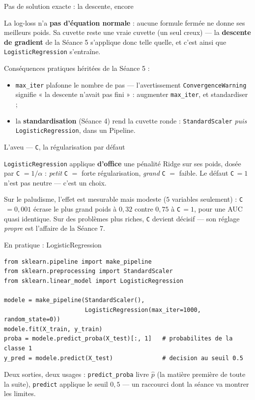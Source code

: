 \documentclass[aspectratio=169,11pt]{beamer}
\begin{document}
\begin{frame}{Pas de solution exacte : la descente, encore}
\begin{ucaddef}
{\small La log-loss n'a \textbf{pas d'équation normale} : aucune formule fermée ne donne ses meilleurs poids. Sa cuvette reste une vraie cuvette (un seul creux) — la \textbf{descente de gradient} de la Séance 5 s'applique donc telle quelle, et c'est ainsi que \texttt{LogisticRegression} s'entraîne.}
\end{ucaddef}
{\small Conséquences pratiques héritées de la Séance 5 :}
\begin{itemize}\small
  \item \texttt{max\_iter} plafonne le nombre de pas — l'avertissement \texttt{ConvergenceWarning} signifie « la descente n'avait pas fini » : augmenter \texttt{max\_iter}, et standardiser ;
  \item la \textbf{standardisation} (Séance 4) rend la cuvette ronde : \texttt{StandardScaler} \emph{puis} \texttt{LogisticRegression}, dans un Pipeline.
\end{itemize}
\end{frame}

\begin{frame}{L'aveu — \texttt{C}, la régularisation par défaut}
\begin{ucadpiege}
{\small \texttt{LogisticRegression} applique \textbf{d'office} une pénalité Ridge sur ses poids, dosée par \texttt{C} $= 1/\alpha$ : \emph{petit} \texttt{C} $=$ forte régularisation, \emph{grand} \texttt{C} $=$ faible. Le défaut \texttt{C}$\,= 1$ n'est pas neutre — c'est un choix.}
\end{ucadpiege}
{\small Sur le paludisme, l'effet est mesurable mais modeste ($5$ variables seulement) : \texttt{C}$\,=0{,}001$ écrase le plus grand poids à $0{,}32$ contre $0{,}75$ à \texttt{C}$\,=1$, pour une AUC quasi identique. Sur des problèmes plus riches, \texttt{C} devient décisif — son réglage \emph{propre} est l'affaire de la Séance 7.}
\end{frame}

\begin{frame}[fragile]{En pratique : LogisticRegression}
\begin{lstlisting}
from sklearn.pipeline import make_pipeline
from sklearn.preprocessing import StandardScaler
from sklearn.linear_model import LogisticRegression

modele = make_pipeline(StandardScaler(),
                       LogisticRegression(max_iter=1000, random_state=0))
modele.fit(X_train, y_train)
proba = modele.predict_proba(X_test)[:, 1]   # probabilites de la classe 1
y_pred = modele.predict(X_test)              # decision au seuil 0.5
\end{lstlisting}
{\small Deux sorties, deux usages : \texttt{predict\_proba} livre $\hat p$ (la matière première de toute la suite), \texttt{predict} applique le seuil $0{,}5$ — un raccourci dont la séance va montrer les limites.}
\end{frame}
\end{document}
